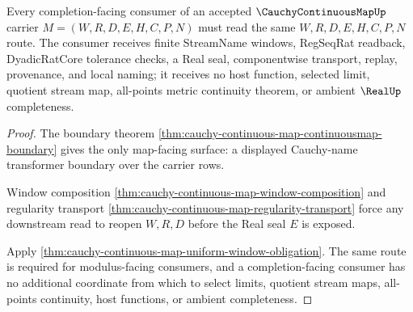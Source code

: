\begin{theorem}
\label{thm:cauchy-continuous-map-completion-consumer-scope}
Every completion-facing consumer of an accepted $\CauchyContinuousMapUp$ carrier $M=(W,R,D,E,H,C,P,N)$ must read the same $W,R,D,E,H,C,P,N$ route. The consumer receives finite StreamName windows, RegSeqRat readback, DyadicRatCore tolerance checks, a Real seal, componentwise transport, replay, provenance, and local naming; it receives no host function, selected limit, quotient stream map, all-points metric continuity theorem, or ambient $\RealUp$ completeness.
\end{theorem}
\begin{proof}
The boundary theorem \autoref{thm:cauchy-continuous-map-continuousmap-boundary} gives the only map-facing surface: a displayed Cauchy-name transformer boundary over the carrier rows.

Window composition \autoref{thm:cauchy-continuous-map-window-composition} and regularity transport \autoref{thm:cauchy-continuous-map-regularity-transport} force any downstream read to reopen $W,R,D$ before the Real seal $E$ is exposed.

Apply \autoref{thm:cauchy-continuous-map-uniform-window-obligation}. The same route is required for modulus-facing consumers, and a completion-facing consumer has no additional coordinate from which to select limits, quotient stream maps, all-points continuity, host functions, or ambient completeness.
\end{proof}

